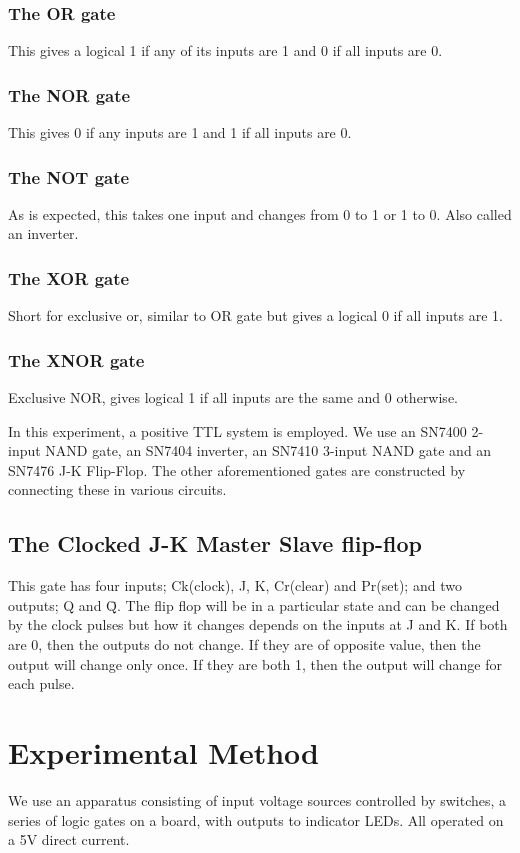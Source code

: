 \documentclass{article}
\begin{document}
\subsubsection*{The OR gate}
This gives a logical 1 if any of its inputs are 1 and 0 if all inputs are 0.
\subsubsection*{The NOR gate}
This gives 0 if any inputs are 1 and 1 if all inputs are 0.
\subsubsection*{The NOT gate}
As is expected, this takes one input and changes from 0 to 1 or 1 to 0. Also called an inverter.
\subsubsection*{The XOR gate}
Short for exclusive or, similar to OR gate but gives a logical 0 if all inputs are 1.
\subsubsection*{The XNOR gate}
Exclusive NOR, gives logical 1 if all inputs are the same and 0 otherwise.

\vspace{5mm}
In this experiment, a positive TTL system is employed. We use an SN7400 2-input NAND gate, an SN7404 inverter, an SN7410 3-input NAND gate and an SN7476 J-K Flip-Flop. The other aforementioned gates are constructed by connecting these in various circuits.

\subsection*{The Clocked J-K Master Slave flip-flop}
This gate has four inputs; Ck(clock), J, K, Cr(clear) and Pr(set); and two outputs; Q and \=Q. The flip flop will be in a particular state and can be changed by the clock pulses but how it changes depends on the inputs at J and K. If both are 0, then the outputs do not change. If they are of opposite value, then the output will change only once. If they are both 1, then the output will change for each pulse.
 
\section{Experimental Method}
We use an apparatus consisting of input voltage sources controlled by switches, a series of logic gates on a board, with outputs to indicator LEDs. All operated on a 5V direct current.
\end{document}
